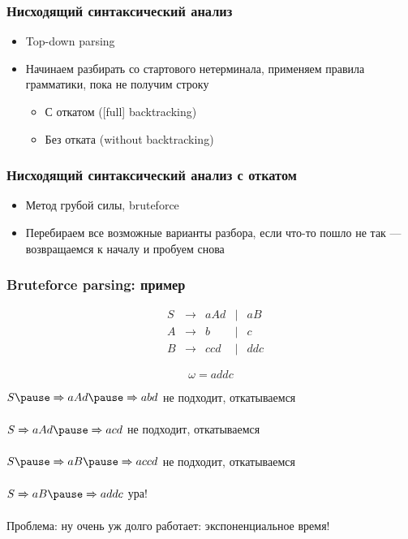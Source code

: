 \documentclass{beamer}
\newcommand{\derives}[0]{\xRightarrow[]{}}
\begin{document}
\begin{frame}[fragile]
  \transwipe[direction=90]
  \frametitle{Нисходящий синтаксический анализ}
  \begin{itemize}
    \item Top-down parsing
    \item Начинаем разбирать со стартового нетерминала, применяем правила грамматики, пока не получим строку
    \begin{itemize}
      \item С откатом ([full] backtracking)
      \item Без отката (without backtracking)
    \end{itemize}
  \end{itemize}
\end{frame}

\begin{frame}[fragile]
  \transwipe[direction=90]
  \frametitle{Нисходящий синтаксический анализ с откатом}
  \begin{itemize}
    \item Метод грубой силы, bruteforce
    \item Перебираем все возможные варианты разбора, если что-то пошло не так --- возвращаемся к началу и пробуем снова
  \end{itemize}
\end{frame}  

\begin{frame}[fragile]
  \transwipe[direction=90]
  \frametitle{Bruteforce parsing: пример}
  \[
  \begin{array}{crcccl}
  &S& \to & a A d & | & a B \\
  &A& \to & b     & | & c \\
  &B& \to & c c d & | & d d c
  \end{array}
  \]
  
  \[\omega = a d d c\] \pause 
  
  $S \pause \derives a A d \pause \derives a b d$ \pause \hfill не подходит, откатываемся \pause 
  
  $S \derives a A d \pause \derives a c d$ \pause \hfill не подходит, откатываемся \pause 
  
  $S \pause \derives a B \pause \derives a c c d$ \pause \hfill не подходит, откатываемся \pause 
  
  $S \derives a B \pause \derives a d d c$ \pause \hfill ура!
  
  \vfill
  
  
  \begin{center}
    Проблема: ну очень уж долго работает: экспоненциальное время!
  \end{center}
\end{frame}
\end{document}
